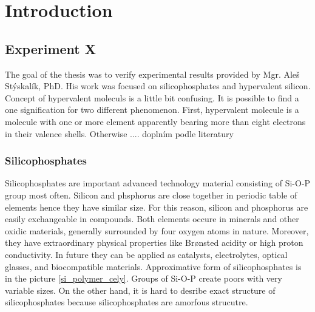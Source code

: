 \documentclass[
  digital, %
  table,   %
  lof,     %
  lot,     %
]{fithesis3}
\begin{document}
\chapter{Introduction}

\section{Experiment  X}
The goal of the thesis was to verify experimental results provided by Mgr. Aleš Stýskalík, PhD. His work was focused on silicophosphates and hypervalent silicon. Concept of hypervalent moleculs is a little bit confusing. It is possible to find a one signification for two different phenomenon. First, hypervalent molecule is a molecule with one or more element apparently bearing more than eight electrons in their valence shells. Otherwise .... doplním podle literatury
\subsection{Silicophosphates}
Silicophosphates are important advanced technology material consisting of Si-O-P group most often. Silicon and phsphorus are close together in periodic table of elements hence they have similar size. For this reason, silicon and phosphorus are easily exchangeable in compounds. Both elements occure in minerals and other oxidic materials, generally surrounded by four oxygen atoms in nature. Moreover, they have extraordinary physical properties like Brønsted acidity or high proton conductivity. In future they can be applied as catalysts, electrolytes, optical glasses, and biocompatible materials. Approximative form of silicophosphates is in the picture \ref{si_polymer_cely}. \cite{Styskalik2015thesis} Groups of Si-O-P create poors with very variable sizes. On the other hand, it is hard to desribe exact structure of silicophosphates because silicophosphates are amorfous strucutre.
\end{document}
